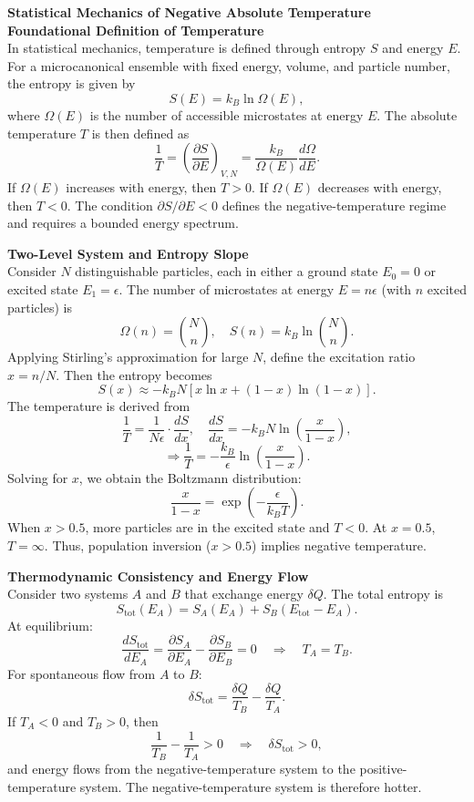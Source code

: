 \begin{technical}
{\Large\textbf{Statistical Mechanics of Negative Absolute Temperature}}\\[0.7em]

\noindent\textbf{Foundational Definition of Temperature}\\[0.5em]
In statistical mechanics, temperature is defined through entropy \( S \) and energy \( E \). For a microcanonical ensemble with fixed energy, volume, and particle number, the entropy is given by
\[
S(E) = k_B \ln \Omega(E),
\]
where \( \Omega(E) \) is the number of accessible microstates at energy \( E \). The absolute temperature \( T \) is then defined as
\[
\frac{1}{T} = \left( \frac{\partial S}{\partial E} \right)_{V,N} = \frac{k_B}{\Omega(E)} \frac{d\Omega}{dE}.
\]
If \( \Omega(E) \) increases with energy, then \( T > 0 \). If \( \Omega(E) \) decreases with energy, then \( T < 0 \). The condition \( \partial S/\partial E < 0 \) defines the negative-temperature regime and requires a bounded energy spectrum.

\noindent\textbf{Two-Level System and Entropy Slope}\\[0.5em]
Consider \( N \) distinguishable particles, each in either a ground state \( E_0 = 0 \) or excited state \( E_1 = \epsilon \). The number of microstates at energy \( E = n \epsilon \) (with \( n \) excited particles) is
\[
\Omega(n) = \binom{N}{n}, \quad S(n) = k_B \ln \binom{N}{n}.
\]
Applying Stirling’s approximation for large \( N \), define the excitation ratio \( x = n/N \). Then the entropy becomes
\[
S(x) \approx -k_B N \left[ x \ln x + (1 - x) \ln (1 - x) \right].
\]
The temperature is derived from
\[
\frac{1}{T} = \frac{1}{N \epsilon} \cdot \frac{dS}{dx}, \quad
\frac{dS}{dx} = -k_B N \ln \left( \frac{x}{1 - x} \right),
\]
\[
\Rightarrow \frac{1}{T} = -\frac{k_B}{\epsilon} \ln \left( \frac{x}{1 - x} \right).
\]
Solving for \( x \), we obtain the Boltzmann distribution:
\[
\frac{x}{1 - x} = \exp \left( -\frac{\epsilon}{k_B T} \right).
\]
When \( x > 0.5 \), more particles are in the excited state and \( T < 0 \). At \( x = 0.5 \), \( T = \infty \). Thus, population inversion (\( x > 0.5 \)) implies negative temperature.

\noindent\textbf{Thermodynamic Consistency and Energy Flow}\\[0.5em]
Consider two systems \( A \) and \( B \) that exchange energy \( \delta Q \). The total entropy is
\[
S_\text{tot}(E_A) = S_A(E_A) + S_B(E_\text{tot} - E_A).
\]
At equilibrium:
\[
\frac{dS_\text{tot}}{dE_A} = \frac{\partial S_A}{\partial E_A} - \frac{\partial S_B}{\partial E_B} = 0 \quad \Rightarrow \quad T_A = T_B.
\]
For spontaneous flow from \( A \) to \( B \):
\[
\delta S_\text{tot} = \frac{\delta Q}{T_B} - \frac{\delta Q}{T_A}.
\]
If \( T_A < 0 \) and \( T_B > 0 \), then
\[
\frac{1}{T_B} - \frac{1}{T_A} > 0 \quad \Rightarrow \quad \delta S_\text{tot} > 0,
\]
and energy flows from the negative-temperature system to the positive-temperature system. The negative-temperature system is therefore hotter.


\end{technical}
